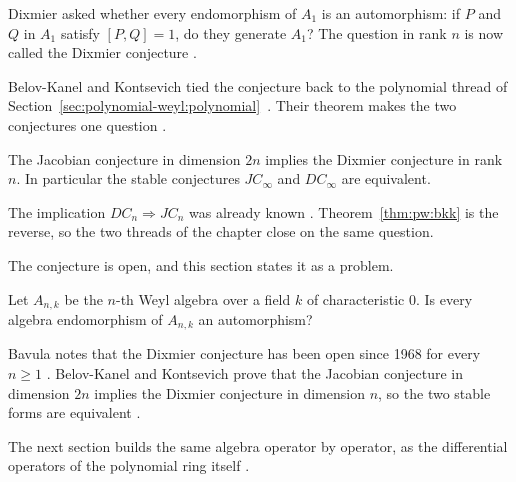 \begin{remark}
\label{rem:pw:dixmier-problem}
Dixmier asked whether every endomorphism of $A_{1}$ is an automorphism:
if $P$ and $Q$ in $A_{1}$ satisfy $[P,Q]=1$, do they generate $A_{1}$?
The question in rank $n$ is now called the Dixmier conjecture
\cite[p.~1]{BelovKanelKontsevich2007}.
\end{remark}

Belov-Kanel and Kontsevich tied the conjecture back to the polynomial
thread of Section~\ref{sec:polynomial-weyl:polynomial}~\cite[p.~2]{BelovKanelKontsevich2007}. Their theorem
makes the two conjectures one question \cite[p.~2]{BelovKanelKontsevich2007}.

\begin{theorem}
\label{thm:pw:bkk}
The Jacobian conjecture in dimension $2n$ implies the Dixmier conjecture
in rank $n$. In particular the stable conjectures $JC_{\infty}$ and
$DC_{\infty}$ are equivalent.
\end{theorem}

The implication $DC_{n}\Rightarrow JC_{n}$ was already known
\cite[p.~1]{BelovKanelKontsevich2007}. Theorem~\ref{thm:pw:bkk} is the
reverse, so the two threads of the chapter close on the same question.

The conjecture is open, and this section states it as a problem.

\begin{problem}\label{prob:open:dixmier}
Let $A_{n,k}$ be the $n$-th Weyl algebra over a field $k$ of characteristic $0$.
Is every algebra endomorphism of $A_{n,k}$ an automorphism?
\end{problem}

Bavula notes that the Dixmier conjecture has been open since 1968 for every
$n\ge1$ \cite[pp.~1--2]{Bavula2017}. Belov-Kanel and Kontsevich prove that the
Jacobian conjecture in dimension $2n$ implies the Dixmier conjecture in
dimension $n$, so the two stable forms are equivalent
\cite[Theorem~1, p.~2]{BelovKanelKontsevich2007}.

The next section builds the same algebra operator by operator, as the
differential operators of the polynomial ring itself
\cite[Theorem~6.2, p.~4]{Hazewinkel2013}.

